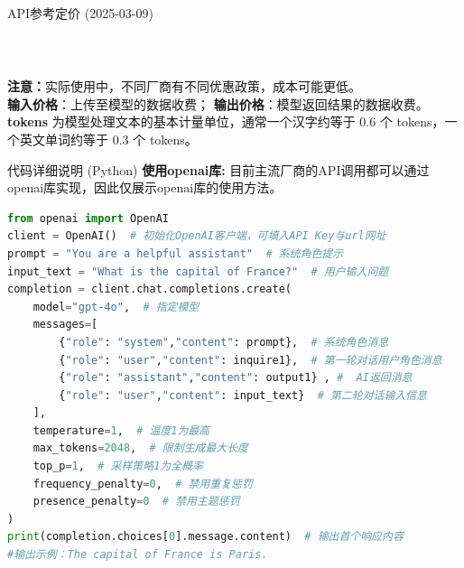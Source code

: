 \documentclass{beamer}
\begin{document}
\begin{frame}{API参考定价 (2025-03-09)}
\begin{table}[htbp]
\begin{tabular}{lll}
        \hline
        \end{tabular}
        \\[5pt]
        \begin{flushleft}
            \tiny
            \textbf{注意：}实际使用中，不同厂商有不同优惠政策，成本可能更低。\\
            \textbf{输入价格}：上传至模型的数据收费；
            \textbf{输出价格}：模型返回结果的数据收费。\\
            \textbf{tokens} 为模型处理文本的基本计量单位，通常一个汉字约等于 0.6 个 tokens，一个英文单词约等于 0.3 个 tokens。
            \end{flushleft}
        \end{table}
        
\end{frame}

\begin{frame}[fragile]{代码详细说明 (Python)}
    \scriptsize
\textbf{使用openai库:} 目前主流厂商的API调用都可以通过openai库实现，因此仅展示openai库的使用方法。

\begin{lstlisting}[language={Python}]
from openai import OpenAI  
client = OpenAI()  # 初始化OpenAI客户端，可填入API Key与url网址
prompt = "You are a helpful assistant"  # 系统角色提示
input_text = "What is the capital of France?"  # 用户输入问题
completion = client.chat.completions.create(
    model="gpt-4o",  # 指定模型
    messages=[ 
        {"role": "system","content": prompt},  # 系统角色消息
        {"role": "user","content": inquire1},  # 第一轮对话用户角色消息
        {"role": "assistant","content": output1} , #  AI返回消息
        {"role": "user","content": input_text}  # 第二轮对话输入信息
    ],
    temperature=1,  # 温度1为最高
    max_tokens=2048,  # 限制生成最大长度
    top_p=1,  # 采样策略1为全概率
    frequency_penalty=0,  # 禁用重复惩罚
    presence_penalty=0  # 禁用主题惩罚
)
print(completion.choices[0].message.content)  # 输出首个响应内容
#输出示例：The capital of France is Paris.
\end{lstlisting}
\end{frame}
\end{document}
